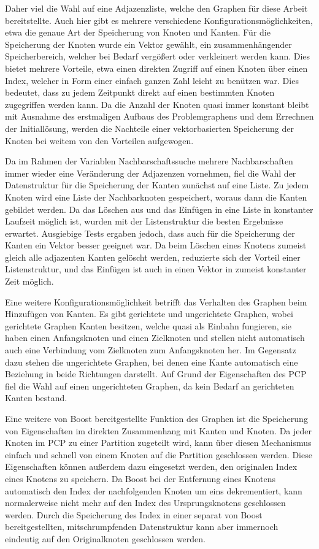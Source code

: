 Daher viel die Wahl auf eine Adjazenzliste, welche den Graphen für diese Arbeit bereitstellte. Auch hier gibt es mehrere verschiedene Konfigurationsmöglichkeiten, etwa die genaue Art der Speicherung von
Knoten und Kanten. Für die Speicherung der Knoten wurde ein Vektor gewählt, ein zusammenhängender Speicherbereich, welcher bei Bedarf vergößert oder verkleinert werden kann. Dies bietet mehrere Vorteile, etwa
einen direkten Zugriff auf einen Knoten über einen Index, welcher in Form einer einfach ganzen Zahl leicht zu benützen war. Dies bedeutet, dass zu jedem Zeitpunkt direkt auf einen bestimmten Knoten zugegriffen
werden kann. Da die Anzahl der Knoten quasi immer konstant bleibt mit Ausnahme des erstmaligen Aufbaus des Problemgraphens und dem Errechnen der Initiallösung, werden die Nachteile einer vektorbasierten
Speicherung der Knoten bei weitem von den Vorteilen aufgewogen. 

Da im Rahmen der Variablen Nachbarschaftssuche mehrere Nachbarschaften immer wieder eine Veränderung der Adjazenzen vornehmen, fiel die Wahl der Datenstruktur für die Spei\-cher\-ung der Kanten zunächst auf eine
Liste. Zu jedem Knoten wird eine Liste der Nachbarknoten gespeichert, woraus dann die Kanten gebildet werden. Da das Löschen aus und das Einfügen in eine Liste in konstanter Laufzeit möglich ist, wurden
mit der Listenstruktur die besten Ergebnisse erwartet. Ausgiebige Tests ergaben jedoch, dass auch für die Speicherung der Kanten ein Vektor besser geeignet war. Da beim Löschen eines Knotens zumeist gleich alle adjazenten
Kanten gelöscht werden, reduzierte sich der Vorteil einer Listenstruktur, und das Einfügen ist auch in einen Vektor in zumeist konstanter Zeit möglich. 

Eine weitere Konfigurationsmöglichkeit betrifft das Verhalten des Graphen beim Hinzufügen von Kanten. Es gibt gerichtete und ungerichtete Graphen, wobei gerichtete Graphen Kanten besitzen, welche quasi
als Einbahn fungieren, sie haben einen Anfangsknoten und einen Zielknoten und stellen nicht automatisch auch eine Verbindung vom Zielknoten zum Anfangsknoten her. Im Gegensatz dazu stehen die ungerichtete Graphen, bei denen
eine Kante automatisch eine Beziehung in beide Richtungen darstellt. Auf Grund der Eigenschaften des PCP fiel die Wahl auf einen ungerichteten Graphen, da kein Bedarf an gerichteten Kanten bestand.

Eine weitere von Boost bereitgestellte Funktion des Graphen ist die Speicherung von Eigenschaften im direkten Zusammenhang mit Kanten und Knoten. Da jeder Knoten im PCP zu einer Partition zugeteilt wird, kann
über diesen Mechanismus einfach und schnell von einem Knoten auf die Partition geschlossen werden. Diese Eigenschaften können außerdem dazu eingesetzt werden, den originalen Index eines Knotens zu speichern.
Da Boost bei der Entfernung eines Knotens automatisch den Index der nachfolgenden Knoten um eins dekrementiert, kann normalerweise nicht mehr auf den Index des Ursprungsknotens geschlossen werden. Durch
die Speicherung des Index in einer separat von Boost bereitgestellten, mitschrumpfenden Datenstruktur kann aber immernoch eindeutig auf den Originalknoten geschlossen werden. 

